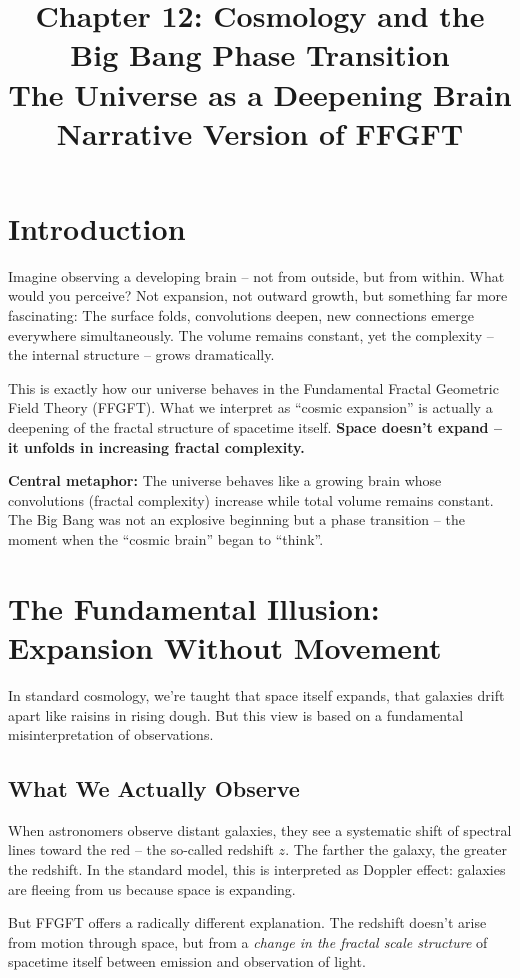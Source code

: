 \documentclass[12pt,a4paper]{article}
\title{\textbf{Chapter 12: Cosmology and the Big Bang Phase Transition} \\
\large The Universe as a Deepening Brain \\
\normalsize Narrative Version of FFGFT}
\author{}
\begin{document}
\maketitle

\section*{Introduction}

Imagine observing a developing brain -- not from outside, but from within. What would you perceive? Not expansion, not outward growth, but something far more fascinating: The surface folds, convolutions deepen, new connections emerge everywhere simultaneously. The volume remains constant, yet the complexity -- the internal structure -- grows dramatically.

This is exactly how our universe behaves in the Fundamental Fractal Geometric Field Theory (FFGFT). What we interpret as ``cosmic expansion'' is actually a deepening of the fractal structure of spacetime itself. \textbf{Space doesn't expand -- it unfolds in increasing fractal complexity.}

\textbf{Central metaphor:} The universe behaves like a growing brain whose convolutions (fractal complexity) increase while total volume remains constant. The Big Bang was not an explosive beginning but a phase transition -- the moment when the ``cosmic brain'' began to ``think''.

\section{The Fundamental Illusion: Expansion Without Movement}

In standard cosmology, we're taught that space itself expands, that galaxies drift apart like raisins in rising dough. But this view is based on a fundamental misinterpretation of observations.

\subsection{What We Actually Observe}

When astronomers observe distant galaxies, they see a systematic shift of spectral lines toward the red -- the so-called redshift $z$. The farther the galaxy, the greater the redshift. In the standard model, this is interpreted as Doppler effect: galaxies are fleeing from us because space is expanding.

But FFGFT offers a radically different explanation. The redshift doesn't arise from motion through space, but from a \textit{change in the fractal scale structure} of spacetime itself between emission and observation of light.
\end{document}

